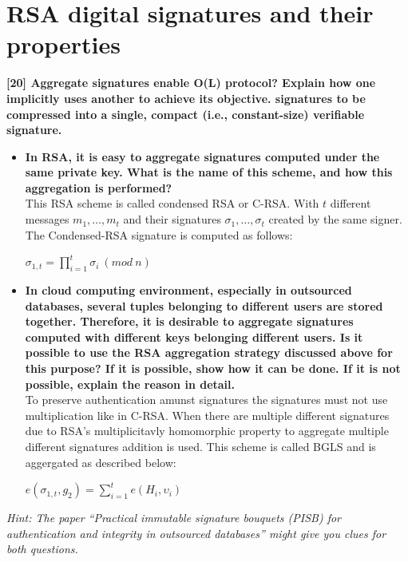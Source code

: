 \documentclass[letterpaper,11pt,notitlepage,fleqn]{article}
\begin{document}
\section{RSA digital signatures and their properties}
\noindent \textbf{[20] Aggregate  signatures  enable  O(L) 
protocol? Explain how one implicitly uses another to achieve its objective.  
signatures to be compressed into a single, compact (i.e., constant-size) verifiable signature.}
\begin{itemize}
    \item \textbf{In  RSA,  it  is  easy  to  aggregate  signatures  computed  under  the  same  private key. What is the name of this scheme, and how this aggregation is performed?} \\
        This RSA scheme is called condensed RSA or C-RSA. With $t$ different messages ${m_{1}, \dots, m_{t}}$ and their signatures ${\sigma_{1}, \dots, \sigma_{t}}$ created by the same signer. The Condensed-RSA signature is computed as follows:\\
        \begin{center}
            $\sigma_{1,t} = \prod\limits_{i = 1}^{t} \sigma_{i}\ (mod\ n)$
        \end{center}
        \cite{myk}

    \item \textbf{In cloud computing environment, especially  in outsourced databases, several tuples  belonging  to  different  users  are  stored  together.  Therefore,  it  is desirable  to  aggregate  signatures  computed  with  different  keys  belonging different  users.  Is  it  possible  to  use  the  RSA  aggregation  strategy  discussed above  for  this  purpose?  If  it  is  possible,  show  how  it  can  be  done.  If  it  is  not possible, explain the reason in
        detail.} \\
        To preserve authentication amunst signatures the signatures must not use multiplication like in C-RSA. When there are multiple different signatures due to RSA's multiplicitavly homomorphic property to aggregate multiple different signatures addition is used. This scheme is called BGLS and is aggergated as described below:

        \begin{center}
            $e(\sigma_{1,t},g_{2}) = \sum\limits_{i=1}^{t}e(H_{i},\upsilon_{i})$
        \end{center}
        \cite{myk}
\end{itemize}
\textit{Hint:  The  paper  “Practical  immutable  signature  bouquets  (PISB)  for authentication and integrity in outsourced databases” might give you clues for both questions.}
\end{document}
